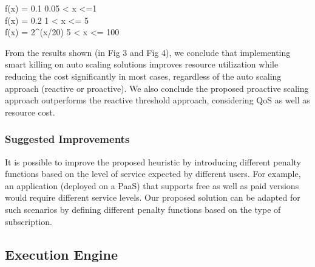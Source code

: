 f(x) = 0.1    0.05 < x <=1 \\
f(x) = 0.2    1 < x <= 5 \\
f(x) = 2^(x/20)    5 < x <= 100 

From the results shown (in Fig 3 and Fig 4), we conclude that implementing smart killing on auto scaling solutions improves resource utilization while reducing the cost significantly in most cases, regardless of the auto scaling approach (reactive or proactive). We also conclude the proposed proactive scaling approach outperforms the reactive threshold approach, considering QoS as well as resource cost.

\subsubsection{Suggested Improvements}

It is possible to improve the proposed heuristic by introducing different penalty functions  based on the level of service expected by different users. For example, an application (deployed on a PaaS) that supports free as well as paid versions would require different service levels. Our proposed solution can be adapted for such scenarios by defining different penalty functions based on the type of subscription.

\subsection{Execution Engine}